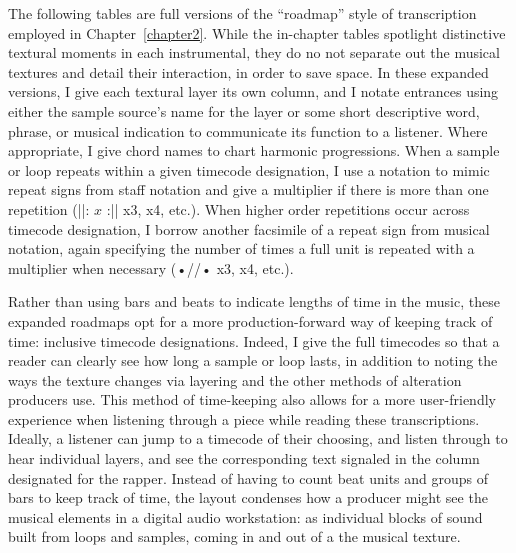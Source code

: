 \onehalfspacing
\appendix \label{appendix:fullroadmaps}
\renewcommand{\thetable}{A.\arabic{table}}
\setcounter{table}{0}

The following tables are full versions of the ``roadmap'' style of transcription employed in
Chapter~\ref{chapter2}. While the in-chapter tables spotlight distinctive textural moments
in each instrumental, they do no not separate out the musical textures and detail their 
interaction, in order to save space. In these expanded versions, I give each textural layer
its own column, and I notate entrances using either the sample source's name for the layer 
or some short descriptive word, phrase, or musical indication to communicate  its function
to a listener. Where appropriate, I give chord names to chart harmonic progressions. When 
a sample or loop repeats within a given timecode designation, I use a notation to mimic 
repeat signs from staff notation and give a multiplier if there is more than one repetition 
(||: $x$ :|| x3, x4, etc.). When higher order repetitions occur across timecode designation, 
I borrow another facsimile of a repeat sign from musical notation, again specifying the 
number of times a full unit is repeated with a multiplier when necessary (•//• x3, x4, etc.).

Rather than using bars and beats to indicate lengths of time in the music, these expanded 
roadmaps opt for a more production-forward way of keeping track of time: inclusive timecode 
designations. Indeed, I give the full timecodes so that a reader can clearly see how long a 
sample or loop lasts, in addition to noting the ways the texture changes via layering and 
the other methods of alteration producers use. This method of time-keeping also allows for 
a more user-friendly experience when listening through a piece while reading these transcriptions. 
Ideally, a listener can jump to a timecode of their choosing, and listen through to hear 
individual layers, and see the corresponding text signaled in the column designated for the 
rapper. Instead of having to count beat units and groups of bars to keep track of time, the 
layout condenses how a producer might see the musical elements in a digital audio workstation: 
as individual blocks of sound built from loops and samples, coming in and out of a the 
musical texture.

